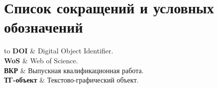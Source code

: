 \chapter*{Список сокращений и условных обозначений}             %
\noindent
\addtocounter{table}{-1}%
\begin{longtabu} to \textwidth {r X} %
	\textbf{DOI} & Digital Object Identifier. \\
	\textbf{WoS} & Web of Science. \\
	\textbf{ВКР}  & Выпускная квалификационная работа. \\
	\textbf{ТГ-объект}  & Текстово-графический объект. \\

\end{longtabu}

